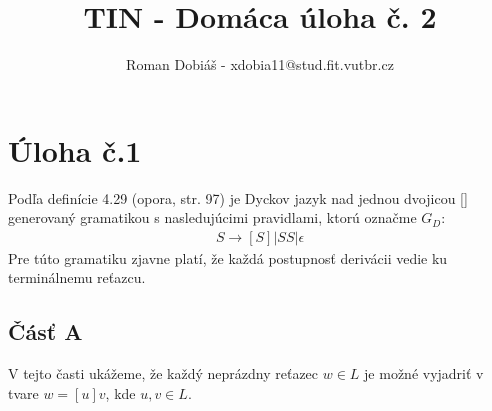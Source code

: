 \documentclass[10pt]{article}
\begin{document}
 
 
 
\title{TIN - Domáca úloha č. 2}%
\author{Roman Dobiáš - xdobia11@stud.fit.vutbr.cz}
 
\maketitle

\section*{Úloha č.1}
Podľa definície 4.29 (opora, str. 97) je Dyckov jazyk nad jednou dvojicou [] generovaný 
gramatikou s nasledujúcimi pravidlami, ktorú označme $G_D$:
\begin{align}
    S \to [ S ] | SS | \epsilon
\end{align}
Pre túto gramatiku zjavne platí, že každá postupnosť derivácii vedie ku terminálnemu reťazcu.

\subsection*{Čásť A}
V tejto časti ukážeme, že každý neprázdny reťazec $w \in L$ je možné vyjadriť v tvare $w = [u]v$,
kde $u,v \in L$.
\end{document}

